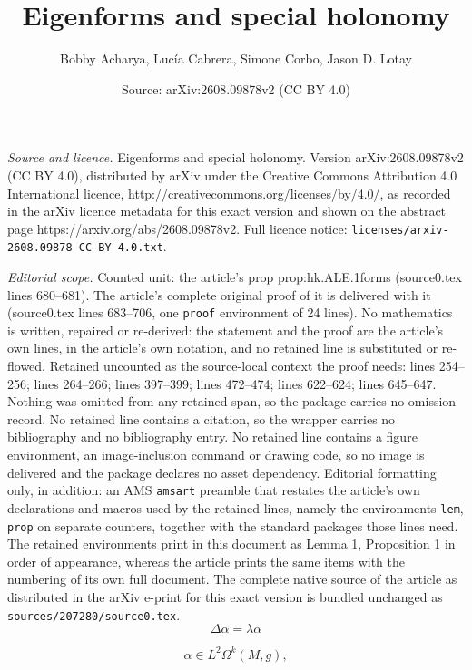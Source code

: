 \documentclass[10pt,a4paper]{amsart}
\title{Eigenforms and special holonomy}
\author{Bobby Acharya, Luc\'ia Cabrera, Simone Corbo, Jason D. Lotay}
\date{Source: arXiv:2608.09878v2 (CC BY 4.0)}
\begin{document}
\maketitle

\noindent\emph{Source and licence.} Eigenforms and special holonomy. Version arXiv:2608.09878v2 (CC BY 4.0), distributed by arXiv under the Creative Commons Attribution 4.0 International licence, http://creativecommons.org/licenses/by/4.0/, as recorded in the arXiv licence metadata for this exact version and shown on the abstract page https://arxiv.org/abs/2608.09878v2. Full licence notice: \texttt{licenses/arxiv-2608.09878-CC-BY-4.0.txt}.\par\smallskip

\noindent\textit{Editorial scope.} Counted unit: the article's prop prop:hk.ALE.1forms (source0.tex lines 680--681). The article's complete original proof of it is delivered with it (source0.tex lines 683--706, one \texttt{proof} environment of 24 lines). No mathematics is written, repaired or re-derived: the statement and the proof are the article's own lines, in the article's own notation, and no retained line is substituted or re-flowed.  Retained uncounted as the source-local context the proof needs: lines 254--256; lines 264--266; lines 397--399; lines 472--474; lines 622--624; lines 645--647.  Nothing was omitted from any retained span, so the package carries no omission record.  No retained line contains a citation, so the wrapper carries no bibliography and no bibliography entry.  No retained line contains a figure environment, an image-inclusion command or drawing code, so no image is delivered and the package declares no asset dependency.  Editorial formatting only, in addition: an AMS \texttt{amsart} preamble that restates the article's own declarations and macros used by the retained lines, namely the environments \texttt{lem}, \texttt{prop} on separate counters, together with the standard packages those lines need.  The retained environments print in this document as Lemma 1, Proposition 1 in order of appearance, whereas the article prints the same items with the numbering of its own full document.  The complete native source of the article as distributed in the arXiv e-print for this exact version is bundled unchanged as \texttt{sources/207280/source0.tex}.
\begin{equation}\label{eq:eigenform}
    \Delta\alpha=\lambda\alpha
\end{equation}

\begin{equation}\label{eq:normalizability.1}
    \alpha\in L^2\Omega^k(M,g),
\end{equation}
\end{document}
